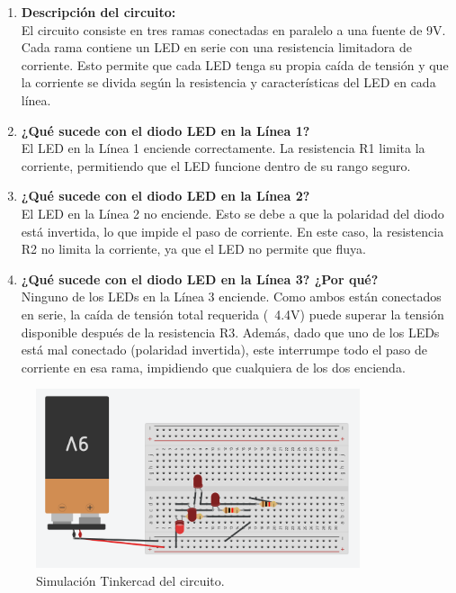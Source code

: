 \documentclass{article}
\begin{document}
\begin{enumerate}
    \item \textbf{Descripción del circuito:} \\
    El circuito consiste en tres ramas conectadas en paralelo a una fuente de 9V. Cada rama contiene un LED en serie con una resistencia limitadora de corriente. Esto permite que cada LED tenga su propia ca\'ida de tensión y que la corriente se divida según la resistencia y caracter\'isticas del LED en cada l\'inea.

    \item \textbf{¿Qué sucede con el diodo LED en la L\'inea 1?} \\
    El LED en la L\'inea 1 enciende correctamente. La resistencia R1 limita la corriente, permitiendo que el LED funcione dentro de su rango seguro.

    \item \textbf{¿Qué sucede con el diodo LED en la L\'inea 2?} \\
    El LED en la L\'inea 2 no enciende. Esto se debe a que la polaridad del diodo est\'a invertida, lo que impide el paso de corriente. En este caso, la resistencia R2 no limita la corriente, ya que el LED no permite que fluya.

    \item \textbf{¿Qué sucede con el diodo LED en la L\'inea 3? ¿Por qué?} \\
    Ninguno de los LEDs en la L\'inea 3 enciende. Como ambos est\'an conectados en serie, la ca\'ida de tensión total requerida (~4.4V) puede superar la tensión disponible después de la resistencia R3. Adem\'as, dado que uno de los LEDs est\'a mal conectado (polaridad invertida), este interrumpe todo el paso de corriente en esa rama, impidiendo que cualquiera de los dos encienda.
\end{enumerate}

\begin{figure}[H]
    \centering
    \includegraphics[width=0.85\textwidth]{./img/ckpt_2_3_1.png}
    \caption{Simulación Tinkercad del circuito.}
    \label{fig:simulacion_implementacion}
\end{figure}
\end{document}
